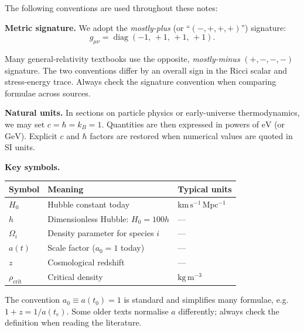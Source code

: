 The following conventions are used throughout these notes:

\medskip
\noindent\textbf{Metric signature.}\quad
We adopt the \emph{mostly-plus} (or ``$(-, +, +, +)$'') signature:
\[
  g_{\mu\nu} = \operatorname{diag}(-1,\,+1,\,+1,\,+1).
\]

\begin{importantnote}
  Many general-relativity textbooks use the opposite, \emph{mostly-minus}
  $(+,-,-,-)$ signature. The two conventions differ by an overall sign in
  the Ricci scalar and stress-energy trace.
  Always check the signature convention when comparing formulae across sources.
\end{importantnote}

\medskip
\noindent\textbf{Natural units.}\quad
In sections on particle physics or early-universe thermodynamics,
we may set $c = \hbar = k_B = 1$.
Quantities are then expressed in powers of $\mathrm{eV}$ (or $\mathrm{GeV}$).
Explicit $c$ and $\hbar$ factors are restored when numerical values are quoted
in SI units.

\medskip
\noindent\textbf{Key symbols.}
\begin{center}
\begin{tabular}{@{}lll@{}}
  \toprule
  Symbol & Meaning & Typical units \\
  \midrule
  $H_0$                    & Hubble constant today             & $\mathrm{km\,s^{-1}\,Mpc^{-1}}$ \\
  $h$                      & Dimensionless Hubble: $H_0=100h$  & --- \\
  $\Omega_i$               & Density parameter for species $i$ & --- \\
  $a(t)$                   & Scale factor ($a_0 = 1$ today)    & --- \\
  $z$                      & Cosmological redshift             & --- \\
  $\rho_\mathrm{crit}$     & Critical density                  & $\mathrm{kg\,m^{-3}}$ \\
  \bottomrule
\end{tabular}
\end{center}

\begin{remark}
  The convention $a_0 \equiv a(t_0) = 1$ is standard and simplifies many formulae,
  e.g.\ $1+z = 1/a(t_e)$.
  Some older texts normalise $a$ differently; always check the definition
  when reading the literature.
\end{remark}

\clearpage

